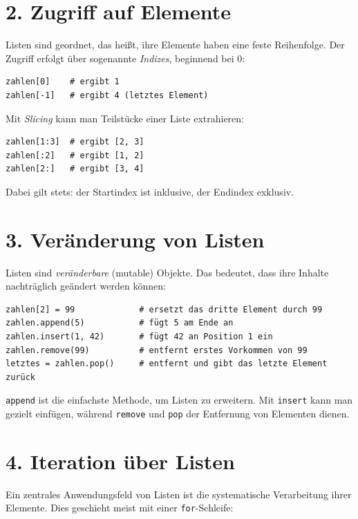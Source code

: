 \documentclass[12pt]{article}
\begin{document}
	\section*{2. Zugriff auf Elemente}
	
	Listen sind geordnet, das heißt, ihre Elemente haben eine feste Reihenfolge. Der Zugriff erfolgt über sogenannte \emph{Indizes}, beginnend bei 0:
	
\begin{verbatim}
zahlen[0]    # ergibt 1
zahlen[-1]   # ergibt 4 (letztes Element)
\end{verbatim}
	
	Mit \emph{Slicing} kann man Teilstücke einer Liste extrahieren:
	
\begin{verbatim}
zahlen[1:3]  # ergibt [2, 3]
zahlen[:2]   # ergibt [1, 2]
zahlen[2:]   # ergibt [3, 4]
\end{verbatim}
	
	Dabei gilt stets: der Startindex ist inklusive, der Endindex exklusiv.
	
	\section*{3. Veränderung von Listen}
	
	Listen sind \emph{veränderbare} (mutable) Objekte. Das bedeutet, dass ihre Inhalte nachträglich geändert werden können:
	
\begin{verbatim}
zahlen[2] = 99             # ersetzt das dritte Element durch 99
zahlen.append(5)           # fügt 5 am Ende an
zahlen.insert(1, 42)       # fügt 42 an Position 1 ein
zahlen.remove(99)          # entfernt erstes Vorkommen von 99
letztes = zahlen.pop()     # entfernt und gibt das letzte Element zurück
\end{verbatim}
	
	\texttt{append} ist die einfachste Methode, um Listen zu erweitern. Mit \texttt{insert} kann man gezielt einfügen, während \texttt{remove} und \texttt{pop} der Entfernung von Elementen dienen.
	
	\section*{4. Iteration über Listen}
	
	Ein zentrales Anwendungsfeld von Listen ist die systematische Verarbeitung ihrer Elemente. Dies geschieht meist mit einer \texttt{for}-Schleife:
	
\end{document}
